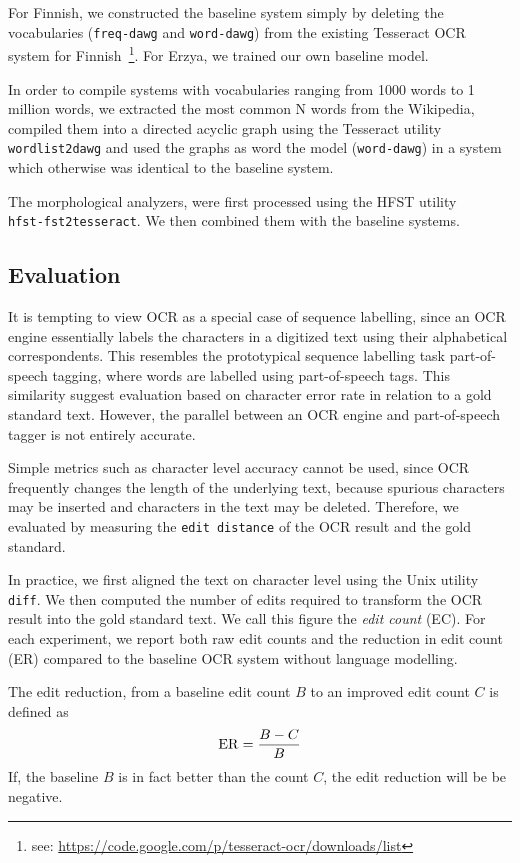 \documentclass[b5paper]{article}
\begin{document}
For Finnish, we constructed the baseline system simply by deleting the
vocabularies ({\tt freq-dawg} and {\tt word-dawg}) from the existing
Tesseract OCR system for Finnish~\footnote{see:
  \url{https://code.google.com/p/tesseract-ocr/downloads/list}}. For
Erzya, we trained our own baseline model.

In order to compile systems with vocabularies ranging from 1000 words
to 1 million words, we extracted the most common N words from the
Wikipedia, compiled them into a directed acyclic graph using the
Tesseract utility {\tt wordlist2dawg} and used the graphs as word the
model ({\tt word-dawg}) in a system which otherwise was identical to
the baseline system.

The morphological analyzers, were first processed using the HFST
utility\\{\tt hfst-fst2tesseract}. We then combined them with the
baseline systems.

\subsection{Evaluation}
It is tempting to view OCR as a special case of sequence labelling,
since an OCR engine essentially labels the characters in a digitized
text using their alphabetical correspondents. This resembles the
prototypical sequence labelling task part-of-speech tagging, where
words are labelled using part-of-speech tags. This similarity suggest
evaluation based on character error rate in relation to a gold
standard text. However, the parallel between an OCR engine and
part-of-speech tagger is not entirely accurate.

Simple metrics such as character level accuracy cannot be used, since
OCR frequently changes the length of the underlying text, because
spurious characters may be inserted and characters in the text may be
deleted. Therefore, we evaluated by measuring the {\tt edit distance}
of the OCR result and the gold standard.

In practice, we first aligned the text on character level using the
Unix utility {\tt diff}. We then computed the number of edits required
to transform the OCR result into the gold standard text. We call this
figure the {\it edit count} (EC). For each experiment, we report both
raw edit counts and the reduction in edit count (ER) compared to the
baseline OCR system without language modelling.

The edit reduction, from a baseline edit count $B$ to an improved edit
count $C$ is defined as
$${\rm ER} = \frac{B - C}{B}$$
If, the baseline $B$ is in fact better than the count $C$, the edit
reduction will be be negative.
\end{document}
